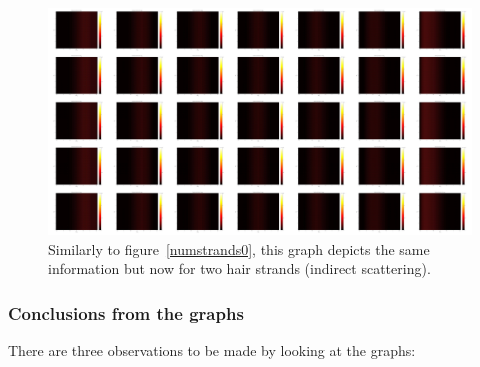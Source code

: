 \documentclass[11pt,a4paper]{report}
\begin{document}
\begin{figure}[h]
\begin{center}
\includegraphics[scale=0.04]{images/scatteringdistribution/numstrands2.jpg}
\caption{Similarly to figure~\ref{numstrands0}, this graph depicts the same information but now for two hair strands (indirect scattering).}
\label{numstrands2}

\end{center}
\end{figure}


\subsubsection*{Conclusions from the graphs}

There are three observations to be made by looking at the graphs:
\end{document}
